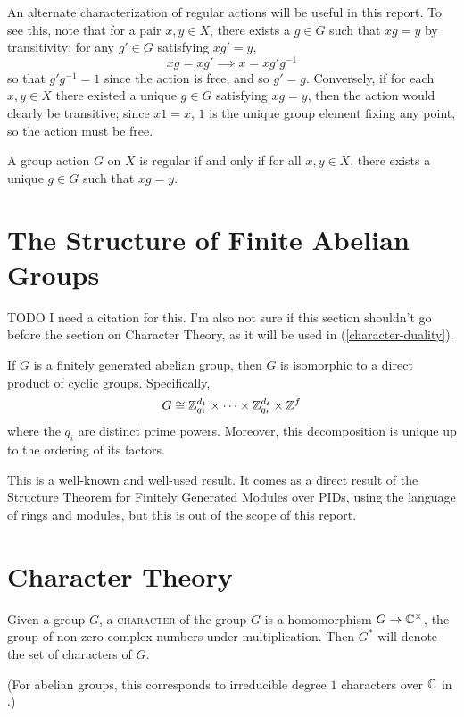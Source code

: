\documentclass{report}
\begin{document}
    An alternate characterization of regular actions will be useful in this
    report.  To see this, note that for a pair $x, y \in X$, there exists a $g
    \in G$ such that $xg = y$ by transitivity; for any $g' \in G$ satisfying
    $xg' = y$,
    $$
      xg = xg' \implies x = x g'g^{-1}
    $$
    so that $g'g^{-1} = 1$ since the action is free, and so $g' = g$.
    Conversely, if for each $x, y \in X$ there existed a unique $g \in G$
    satisfying $xg = y$, then the action would clearly be transitive; since $x 1
    = x$, $1$ is the unique group element fixing any point, so the action must
    be free.

    \begin{lem}\label{regular-unique}
      A group action $G$ on $X$ is regular if and only if
      for all $x, y \in X$, there exists a unique $g \in G$
      such that $xg = y$.
    \end{lem}

  \section{The Structure of Finite Abelian Groups}
    TODO I need a citation for this.
    I'm also not sure if this section shouldn't go before the section on
    Character Theory, as it will be used in (\ref{character-duality}).

    \begin{thm}\label{thm:abelian-structure}
      If $G$ is a finitely generated abelian group,
      then $G$ is isomorphic to a direct product of cyclic groups.
      Specifically,
      $$
        G \cong
        \mathbb{Z}_{q_1}^{d_1} \times \cdots \times \mathbb{Z}_{q_t}^{d_t}
        \times \mathbb{Z}^f
      $$
      where the $q_i$ are distinct prime powers.
      Moreover, this decomposition is unique up to the ordering of its factors.
    \end{thm}

    This is a well-known and well-used result.  It comes as a direct result of
    the Structure Theorem for Finitely Generated Modules over PIDs, using the
    language of rings and modules, but this is out of the scope of this report.

  \section{Character Theory}
    \begin{defn}[Characters]\label{character}
      Given a group $G$, a \textsc{character} of the group $G$
      is a homomorphism $G \to \mathbb{C}^\times$,
      the group of non-zero complex numbers under multiplication.
      Then $G^*$ will denote the set of characters of $G$.
      \cite[Chapter 8]{godsil}

      (For abelian groups, this corresponds to irreducible degree $1$ characters
      over $\mathbb{C}$ in \cite[Section 18.3]{dummit-foote}.)
    \end{defn}
\end{document}
